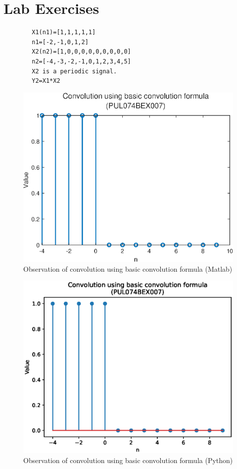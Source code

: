 \documentclass{lab_sheet}
\begin{document}
\section{Lab Exercises}
\begin{verbatim}
        X1(n1)=[1,1,1,1,1]
        n1=[-2,-1,0,1,2]
        X2(n2)=[1,0,0,0,0,0,0,0,0,0]
        n2=[-4,-3,-2,-1,0,1,2,3,4,5]
        X2 is a periodic signal.
        Y2=X1*X2
    \end{verbatim}
\begin{figure}[H]
	\centering
	\includegraphics[width=0.73\linewidth]{../Figures/lab_3_1_ml.eps}
	\caption{Observation of convolution using basic convolution formula (Matlab)}
	\label{fig:3_1_ml}
\end{figure}
\begin{figure}[H]
	\centering
	\includegraphics[width=0.8\linewidth]{../Figures/lab_3_1_py.eps}
	\caption{Observation of convolution using basic convolution formula (Python)}
	\label{fig:3_1_py}
\end{figure}
\end{document}
